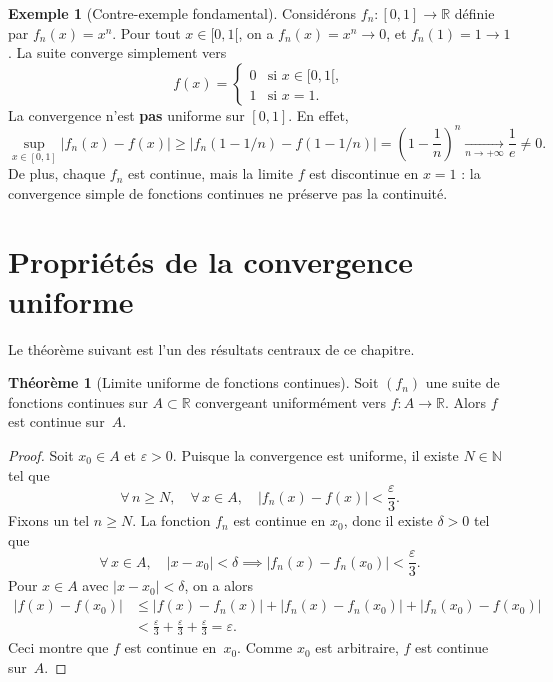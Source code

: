 \documentclass[12pt,a4paper,openany]{book}
\theoremstyle{definition}
\newtheorem{theoreme}{Théorème}[chapter]
\newtheorem{exemple}{Exemple}[chapter]
\newcommand{\N}{\mathbb{N}}
\newcommand{\R}{\mathbb{R}}
\newcommand{\eps}{\varepsilon}
\newcommand{\abs}[1]{\left\lvert #1 \right\rvert}
\begin{document}
\begin{exemple}[Contre-exemple fondamental]\label{ex:xn-pas-cvu}
  Considérons $f_n \colon [0,1] \to \R$ définie par $f_n(x) = x^n$. Pour tout $x \in [0,1[$, on a $f_n(x) = x^n \to 0$, et $f_n(1) = 1 \to 1$. La suite converge simplement vers
  \[
    f(x) = \begin{cases} 0 & \text{si } x \in [0,1[, \\ 1 & \text{si } x = 1. \end{cases}
  \]
  La convergence n'est \textbf{pas} uniforme sur $[0,1]$. En effet,
  \[
    \sup_{x \in [0,1]}\abs{f_n(x) - f(x)} \geqslant \abs{f_n(1 - 1/n) - f(1-1/n)} = \left(1 - \frac{1}{n}\right)^n \xrightarrow[n \to +\infty]{} \frac{1}{e} \neq 0.
  \]
  De plus, chaque $f_n$ est continue, mais la limite $f$ est discontinue en $x = 1$ : la convergence simple de fonctions continues ne préserve pas la continuité.
\end{exemple}

\section{Propriétés de la convergence uniforme}
\label{sec:proprietes-cvu}

Le théorème suivant est l'un des résultats centraux de ce chapitre.

\begin{theoreme}[Limite uniforme de fonctions continues]\label{thm:limite-uniforme-continue}
  Soit $(f_n)$ une suite de fonctions continues sur $A \subset \R$ convergeant uniformément vers $f \colon A \to \R$. Alors $f$ est continue sur~$A$.
\end{theoreme}

\begin{proof}
  Soit $x_0 \in A$ et $\eps > 0$. Puisque la convergence est uniforme, il existe $N \in \N$ tel que
  \[
    \forall\, n \geqslant N, \quad \forall\, x \in A, \quad \abs{f_n(x) - f(x)} < \frac{\eps}{3}.
  \]
  Fixons un tel $n \geqslant N$. La fonction $f_n$ est continue en $x_0$, donc il existe $\delta > 0$ tel que
  \[
    \forall\, x \in A, \quad \abs{x - x_0} < \delta \implies \abs{f_n(x) - f_n(x_0)} < \frac{\eps}{3}.
  \]
  Pour $x \in A$ avec $\abs{x - x_0} < \delta$, on a alors
  \begin{align*}
    \abs{f(x) - f(x_0)}
    &\leqslant \abs{f(x) - f_n(x)} + \abs{f_n(x) - f_n(x_0)} + \abs{f_n(x_0) - f(x_0)} \\
    &< \frac{\eps}{3} + \frac{\eps}{3} + \frac{\eps}{3} = \eps.
  \end{align*}
  Ceci montre que $f$ est continue en~$x_0$. Comme $x_0$ est arbitraire, $f$ est continue sur~$A$.
\end{proof}
\end{document}
